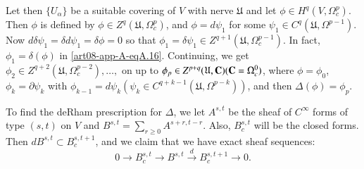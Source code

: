 Let then $\{U_{\alpha}\}$ be a suitable covering of $V$ with nerve $\mathfrak{U}$ and let $\phi\in H^{q}(V,\Omega^{p}_{c})$. Then $\phi$ is defined by $\phi\in Z^{q}(\mathfrak{U},\Omega^{p}_{c})$, and $\phi=d\psi_{1}$ for some $\psi_{1}\in C^{q}(\mathfrak{U},\Omega^{p-1})$. Now $d\delta \psi_{1}=\delta d\psi_{1}=\delta \phi=0$ so that $\phi_{1}=\delta \psi_{1}\in Z^{q+1}(\mathfrak{U}, \Omega^{p-1}_{c})$. In fact, $\phi_{1}=\delta(\phi)$ in \eqref{art08-app-A-eqA.16}. Continuing, we get $\phi_{2}\in Z^{q+2}(\mathfrak{U},\Omega^{p-2}_{c}),\ldots,$ on up to $\phi_{p}\in Z^{p+q}(\mathfrak{U},\mathbf{C})(\mathbf{C}=\Omega^{0}_{c})$, where $\phi=\phi_{0}$, $\phi_{k}=\partial \psi_{k}$ with $\phi_{k-1}=d\psi_{k}(\psi_{k}\in C^{q+k-1}(\mathfrak{U},\Omega^{p-k}))$, and then $\Delta(\phi)=\phi_{p}$.

To find the deRham prescription for $\Delta$, we let $A^{s,t}$ be the sheaf of $C^{\infty}$ forms of type $(s,t)$ on $V$ and $B^{s,t}=\sum\limits_{r\geq 0}A^{s+r,t-r}$. Also, $B^{s,t}_{c}$ will be the closed forms. Then $dB^{s,t}\subset B^{s,t+1}_{c}$, and we claim that we have exact sheaf sequences:
\begin{equation}
0\to B^{s,t}_{c}\to B^{s,t}\xrightarrow{d} B^{s,t+1}_{c}\to 0.\label{art08-app-A-eqA.19}
\end{equation}

